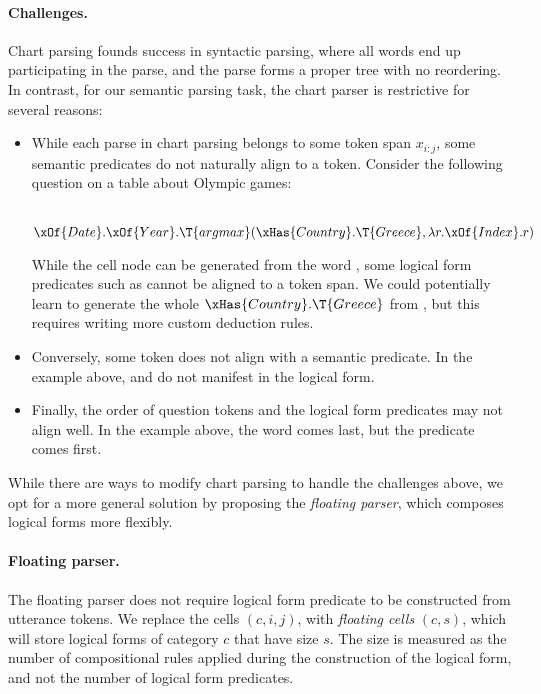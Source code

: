 \paragraph{Challenges.}
Chart parsing founds success in syntactic parsing,
where all words end up participating in the parse,
and the parse forms a proper tree with no reordering.
In contrast, for our semantic parsing task,
the chart parser is restrictive for several reasons:
\begin{itemize}
\item
While each parse in chart parsing belongs
to some token span $x_{i:j}$,
some semantic predicates do not naturally align
to a token.
Consider the following question on a table about
Olympic games:
\begin{center}
 \\
$\xOf{Date}.\xOf{Year}.\T{argmax}(\xHas{Country}.\T{Greece}, \lambda r.\xOf{Index}.r)$
\end{center}
While the cell node  can be generated from
the word , some logical form predicates
such as  cannot be aligned to a token span.
We could potentially learn to generate the whole
$\xHas{Country}.\T{Greece}$ from ,
but this requires writing more custom deduction rules.
\item
Conversely, some token does not align with
a semantic predicate.
In the example above,  and 
do not manifest in the logical form.
\item
Finally, the order of question tokens
and the logical form predicates
may not align well.
In the example above,
the word  comes last,
but the predicate  comes first.
\end{itemize}

While there are ways to modify chart parsing to handle the
challenges above, we opt for a more general solution
by proposing the \emph{floating parser},
which composes logical forms more flexibly.

\paragraph{Floating parser.}
The floating parser does not require logical form predicate to
be constructed from utterance tokens.
We replace the cells $(c, i, j)$,
with \emph{floating cells} $(c, s)$,
which will store logical forms
of category $c$ that have size $s$.
The size is measured as the number of compositional rules applied
during the construction of the logical form,
and not the number of logical form predicates.


